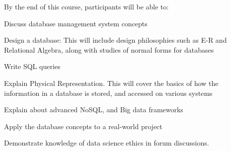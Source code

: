 By the end of this course, participants will be able to:

\begin{outline}
	\1  	Discuss database management system concepts
	
	\1  	Design a database: 
		This will include design philosophies such as E-R and Relational Algebra, along with studies of 
		normal forms for databases

	\1  	Write SQL queries

	\1  	Explain Physical Representation. 
		This will cover the basics of how the information in a database is stored, and accessed on various systems

	\1  	Explain about advanced NoSQL, and Big data frameworks 

	\1  	Apply the database concepts to a real-world project

	\1  	Demonstrate knowledge of data science ethics in forum discussions.

\end{outline} 
